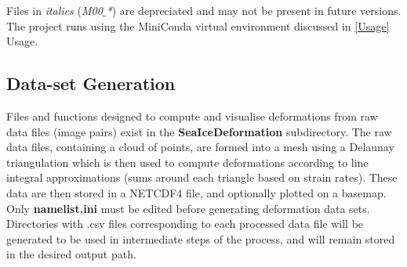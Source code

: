\documentclass[12pt]{article}
\begin{document}
Files in \textit{italics} (\textit{M00$\_$*}) are depreciated and may not be present in future versions. The project runs using the MiniConda virtual environment discussed in \ref{Usage} Usage.

\subsection{Data-set Generation}

Files and functions designed to compute and visualise deformations from raw data files (image pairs) exist in the \textbf{SeaIceDeformation} subdirectory. The raw data files, containing a cloud of points, are formed into a mesh using a Delaunay triangulation which is then used to compute deformations according to line integral approximations (sums around each triangle based on strain rates). These data are then stored in a NETCDF4 file, and optionally plotted on a basemap. Only \textbf{namelist.ini} must be edited before generating deformation data sets. Directories with .csv files corresponding to each processed data file will be generated to be used in intermediate steps of the process, and will remain stored in the desired output path.
\end{document}
